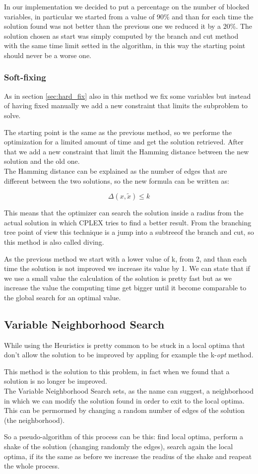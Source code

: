 In our implementation we decided to put a percentage on the number of blocked variables, in particular we started from a value of $90\%$ and than for each time the solution found was not better than the previous one we reduced it by a $20\%$. The solution chosen as start was simply computed by the branch and cut method with the same time limit setted in the algorithm, in this way the starting point should never be a worse one.


\subsubsection{Soft-fixing}
As in section \ref{sec:hard_fix} also in this method we fix some variables but instead of having fixed manually we add a new constraint that limits the subproblem to solve.

The starting point is the same as the previous method, so we performe the optimization for a limited amount of time and get the solution retrieved. After that we add a new constraint that limit the Hamming distance between the new solution and the old one.\\
The Hamming distance can be explained as the number of edges that are different between the two solutions, so the new formula can be written as:

\begin{equation}
	\Delta(x, \tilde{x}) \le k
\end{equation}

This means that the optimizer can search the solution inside a radius from the actual solution in which CPLEX tries to find a better result. From the branching tree point of view this technique is a jump into a subtreeof the branch and cut, so this method is also called diving.

As the previous method we start with a lower value of k, from 2, and than each time the solution is not improved we increase its value by 1. We can state that if we use a small value the calculation of the solution is pretty fast but as we increase the value the computing time get bigger until it become comparable to the global search for an optimal value.

\subsection{Variable Neighborhood Search}
While using the Heuristics is pretty common to be stuck in a local optima that don't allow the solution to be improved by appling for example the k-\textit{opt} method.

This method is the solution to this problem, in fact when we found that a solution is no longer be improved.\\ 
The Variable Neighborhood Search sets, as the name can suggest, a neighborhood in which we can modify the solution found in order to exit to the local optima. This can be permormed by changing a random number of edges of the solution (the neighborhood).

So a pseudo-algorithm of this process can be this: find local optima, perform a shake of the solution (changing randomly the edges), search again the local optima, if its the same as before we increase the readius of the shake and reapeat the whole process.